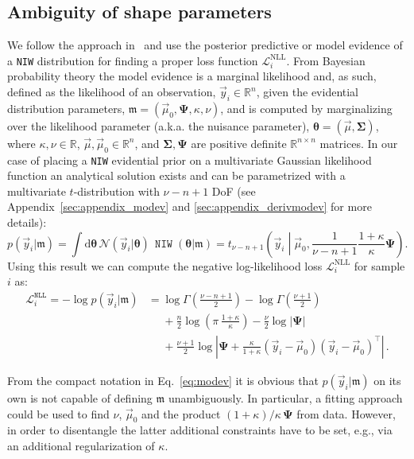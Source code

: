 \documentclass{article}
\begin{document}
\subsection{Ambiguity of shape parameters}
We follow the approach in~\cite{amini20} and use the posterior predictive or model evidence of a \texttt{NIW} distribution for finding a proper loss function $\mathcal{L}_i^\text{NLL}$.
From Bayesian probability theory the model evidence is a marginal likelihood and, as such, defined as the likelihood of an observation, $\vec{y}_i \in \mathbb{R}^n$, given the evidential distribution parameters, $\mathfrak{m}=(\vec{\mu}_0, \bm{\Psi}, \kappa, \nu)$, and is computed by marginalizing over the likelihood parameter (a.k.a. the nuisance parameter), $\bm{\theta} = (\vec{\mu}, \bm{\Sigma})$, where $\kappa, \nu \in \mathbb{R}$, $\vec{\mu}, \vec{\mu}_0 \in \mathbb{R}^n$, and $\bm{\Sigma}, \bm{\Psi}$ are positive definite $\mathbb{R}^{n \times n}$ matrices.
In our case of placing a \texttt{NIW} evidential prior on a multivariate Gaussian likelihood function an analytical solution exists and can be parametrized with a multivariate $t$-distribution with $\nu - n + 1$ DoF (see Appendix~\ref{sec:appendix_modev} and \ref{sec:appendix_derivmodev} for more details):
\begin{equation}
    \label{eq:modev}
    p(\vec{y}_i | \mathfrak{m})
    = \int \! \mathrm{d} \bm{\theta} \, \mathcal{N}(\vec{y}_i | \bm{\theta}) \,  \operatorname{\texttt{NIW}}(\bm{\theta} | \mathfrak{m}) 
    = t_{\nu-n+1} \left( \vec{y}_i \middle| \vec{\mu}_0, \frac{1}{\nu - n + 1} \frac{1 + \kappa}{\kappa} \bm{\Psi} \right).
\end{equation}
Using this result we can compute the negative log-likelihood loss $\mathcal{L}^{\text{NLL}}_i$ for sample $i$ as:
\begin{align}
    \mathcal{L}^{\texttt{NLL}}_i = - \log p(\vec{y}_i | \mathfrak{m}) 
    &= \log \Gamma\!\left( \frac{\nu - n + 1}{2} \right) - \log \Gamma\!\left( \frac{\nu + 1}{2} \right) \nonumber \\
    &\phantom{=} + \frac{n}{2} \log\!\left( \pi \, \frac{1 + \kappa}{\kappa} \right) - \frac{\nu}{2} \log |\bm{\Psi}| \nonumber \\
    &\phantom{=} + \frac{\nu + 1}{2} \log \left| \bm{\Psi} + \frac{\kappa}{1 + \kappa} (\vec{y}_i - \vec{\mu}_0) (\vec{y}_i - \vec{\mu}_0)^\top \right| \,. \label{eq:nll}
\end{align}

From the compact notation in Eq.~\eqref{eq:modev} it is obvious that $p(\vec{y}_i | \mathfrak{m})$ on its own is not capable of defining $\mathfrak{m}$ unambiguously.
In particular, a fitting approach could be used to find $\nu$, $\vec{\mu}_0$ and the product $(1+\kappa)/\kappa \, \bm{\Psi}$ from data.
However, in order to disentangle the latter additional constraints have to be set, e.g., via an additional regularization of $\kappa$.
\end{document}
